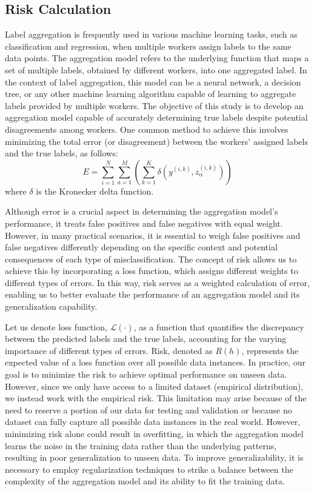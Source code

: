 \subsection{Risk Calculation}
Label aggregation is frequently used in various machine learning tasks, such as classification and regression, when multiple workers assign labels to the same data points. The aggregation model refers to the underlying function that maps a set of multiple labels, obtained by different workers, into one aggregated label. In the context of label aggregation, this model can be a neural network, a decision tree, or any other machine learning algorithm capable of learning to aggregate labels provided by multiple workers. The objective of this study is to develop an aggregation model capable of accurately determining true labels despite potential disagreements among workers. One common method to achieve this involves minimizing the total error (or disagreement) between the workers' assigned labels and the true labels, as follows:
\begin{equation}
    E = \sum_{i=1}^N \sum_{a=1}^M \left( \sum_{k=1}^K \delta\left(y^{(i,k)}, z_\alpha^{(i,k)}\right) \right)
    \label{eq:crowd.Eq.1.risk.error}
\end{equation}
where $\delta $ is the Kronecker delta function.

Although error is a crucial aspect in determining the aggregation model's performance, it treats false positives and false negatives with equal weight. However, in many practical scenarios, it is essential to weigh false positives and false negatives differently depending on the specific context and potential consequences of each type of misclassification. The concept of risk allows us to achieve this by incorporating a loss function, which assigns different weights to different types of errors. In this way, risk serves as a weighted calculation of error, enabling us to better evaluate the performance of an aggregation model and its generalization capability.

Let us denote loss function, $\mathcal{L}(\cdot)$, as a function that quantifies the discrepancy between the predicted labels and the true labels, accounting for the varying importance of different types of errors. Risk, denoted as $R(h) $, represents the expected value of a loss function over all possible data instances.  In practice, our goal is to minimize the risk to achieve optimal performance on unseen data. However, since we only have access to a limited dataset (empirical distribution), we instead work with the empirical risk. This limitation may arise because of the need to reserve a portion of our data for testing and validation or because no dataset can fully capture all possible data instances in the real world. However, minimizing risk alone could result in overfitting, in which the aggregation model learns the noise in the training data rather than the underlying patterns, resulting in poor generalization to unseen data. To improve generalizability, it is necessary to employ regularization techniques to strike a balance between the complexity of the aggregation model and its ability to fit the training data.

